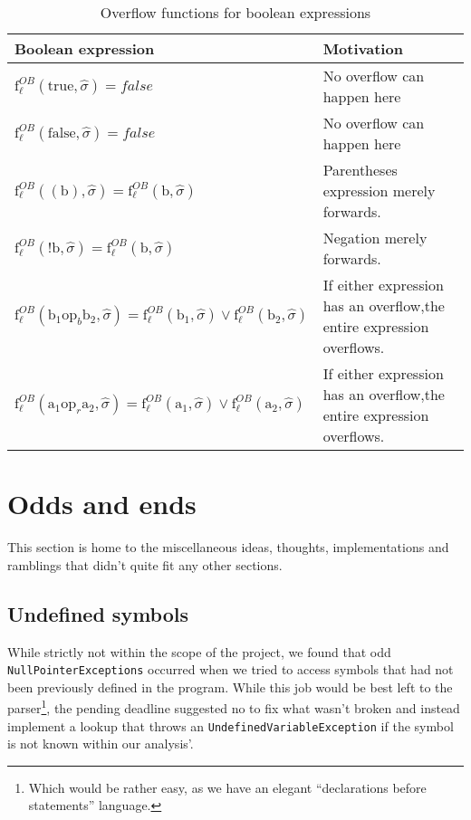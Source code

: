 \begin{table}[h]
\begin{tabular}{| l | l |}
  \hline
  Boolean expression & Motivation\\
  \hline
  \hline
  $\text{f}_\ell^{OB} (\text{true},\widehat{\sigma}) = false $ & No overflow can happen here\\ 
  \hline
  $\text{f}_\ell^{OB} (\text{false},\widehat{\sigma}) = false $ & No overflow can happen here\\ 
  \hline
  $\text{f}_\ell^{OB} ((\text{b}),\widehat{\sigma}) = \text{f}_\ell^{OB} (\text{b}, \widehat{\sigma}) $ & Parentheses expression merely forwards.\\ 
  \hline
    $\text{f}_\ell^{OB} (\text{!b},\widehat{\sigma}) = \text{f}_\ell^{OB} (\text{b}, \widehat{\sigma}) $ & Negation merely forwards.\\ 
  \hline
   $\text{f}_\ell^{OB} (\text{b}_1 \text{op}_b \text{b}_2, \widehat{\sigma}) = \text{f}_\ell^{OB} (\text{b}_1, \widehat{\sigma}) \vee \text{f}_\ell^{OB} (\text{b}_2, \widehat{\sigma})$ & If either expression has an overflow,the entire expression overflows.\\     
  \hline
     $\text{f}_\ell^{OB} (\text{a}_1 \text{op}_r \text{a}_2, \widehat{\sigma}) = \text{f}_\ell^{OB} (\text{a}_1, \widehat{\sigma}) \vee \text{f}_\ell^{OB} (\text{a}_2, \widehat{\sigma})$ & If either expression has an overflow,the entire expression overflows.\\     
  \hline
\end{tabular}
\centering
\caption{Overflow functions for boolean expressions}
\label{table:overflow_functions_boolean_expressions}
\end{table}





\section{Odds and ends}
This section is home to the miscellaneous ideas, thoughts, implementations and ramblings that didn't quite fit any other sections.

\subsection{Undefined symbols}
While strictly not within the scope of the project, we found that odd \texttt{NullPointerExceptions} occurred when we tried to access symbols that had not been previously defined in the program. While this job would be best left to the parser\footnote{Which would be rather easy, as we have an elegant ``declarations before statements'' language.}, the pending deadline suggested no to fix what wasn't broken and instead implement a lookup that throws an \texttt{UndefinedVariableException} if the symbol is not known within our analysis'.



